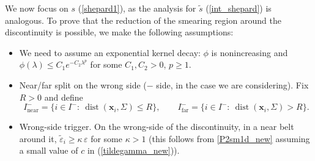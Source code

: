 \documentclass[preprint]{elsarticle}       %
\begin{document}
We now focus on $s$ (\ref{shepard1}), as the analysis for $\tilde{s}$ (\ref{int_shepard}) is analogous. To prove that the reduction of the smearing region around the discontinuity is possible, we make the following assumptions:
\begin{itemize}
\item[(A1)] We need to assume an exponential kernel decay: $\phi$ is nonincreasing and
$\phi(\lambda)\le C_1 e^{-C_2\lambda^p}$ for some $C_1,C_2>0$, $p\ge 1$.
\item[(A2)] Near/far split on the wrong side ($-$ side, in the case we are considering). Fix $R>0$ and define
\[
I^{-}_{\mathrm{near}}=\{i\in I^{-}:\ \operatorname{dist}(\mathbf{x}_i,\Sigma)\le R\},\qquad
I^{-}_{\mathrm{far}}=\{i\in I^{-}:\ \operatorname{dist}(\mathbf{x}_i,\Sigma)> R\}.
\]
\item[(A3)] Wrong-side trigger. On the wrong-side of the discontinuity, in a near belt around it, $\tilde\varepsilon_i\ge \kappa\,\varepsilon$
for some $\kappa>1$ (this follows from \ref{P2sm1d_new} assuming a small value of $c$ in (\ref{tildegamma_new})).
\end{itemize}
\end{document}
